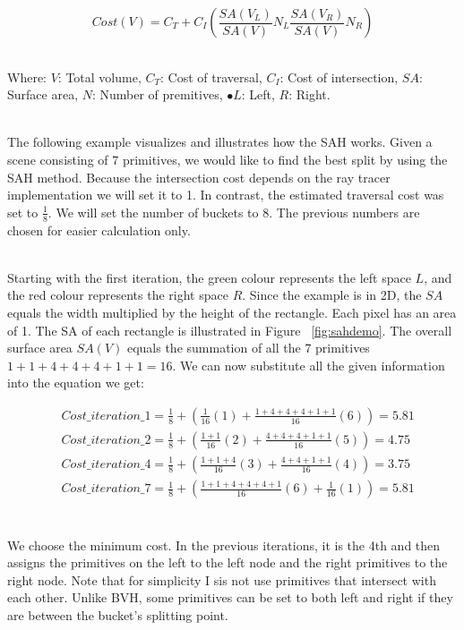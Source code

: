 \documentclass[11pt,a4paper]{article}
\begin{document}
\begin{equation}
Cost(V) = C_T + C_I(\frac{SA(V_L)}{SA(V)}N_L \frac{SA(V_R)}{SA(V)}N_R)
\end{equation}

\noindent
\\
Where: $V$: Total volume, $C_T$: Cost of traversal, $C_I$: Cost of intersection, $SA$: Surface area, $N$: Number of premitives, $•L$: Left, $R$: Right.

\noindent
\\
The following example visualizes and illustrates how the SAH works. Given a scene consisting of 7 primitives, we would like to find the best split by using the SAH method. Because the intersection cost depends on the ray tracer implementation we will set it to 1. In contrast, the estimated traversal cost was set to $\frac{1}{8}$. We will set the number of buckets to 8. The previous numbers are chosen for easier calculation only.

\noindent
\\
Starting with the first iteration, the green colour represents the left space $L$, and the red colour represents the right space $R$. Since the example is in 2D, the $SA $ equals the width multiplied by the height of the rectangle. Each pixel has an area of 1. The SA of each rectangle is illustrated in Figure ~\ref{fig:sahdemo}. The overall surface area $SA(V)$ equals the summation of all the 7 primitives $1+1+4+4+4+1+1 = 16$. We can now substitute all the given information into the equation we get: 


\begin{align*}
& Cost\_iteration\_1 =  \frac{1}{8} + (\frac{1}{16}(1) +\frac{1+4+4+4+1+1}{16}(6)) = 5.81 \\
&Cost\_iteration\_2 =  \frac{1}{8} + (\frac{1+1}{16}(2) +\frac{4+4+4+1+1}{16}(5)) = 4.75 \\
&Cost\_iteration\_4 =  \frac{1}{8} + (\frac{1+1+4}{16}(3) +\frac{4+4+1+1}{16}(4)) = 3.75 \\
&Cost\_iteration\_7 =  \frac{1}{8} + (\frac{1+1+4+4+4+1}{16}(6) +\frac{1}{16}(1)) = 5.81 \\
\end{align*}


\noindent
\\
We choose the minimum cost. In the previous iterations, it is the 4th and then assigns the primitives on the left to the left node and the right primitives to the right node. Note that for simplicity I sis not use primitives that intersect with each other. Unlike BVH, some primitives can be set to both left and right if they are between the bucket's splitting point.
\end{document}
